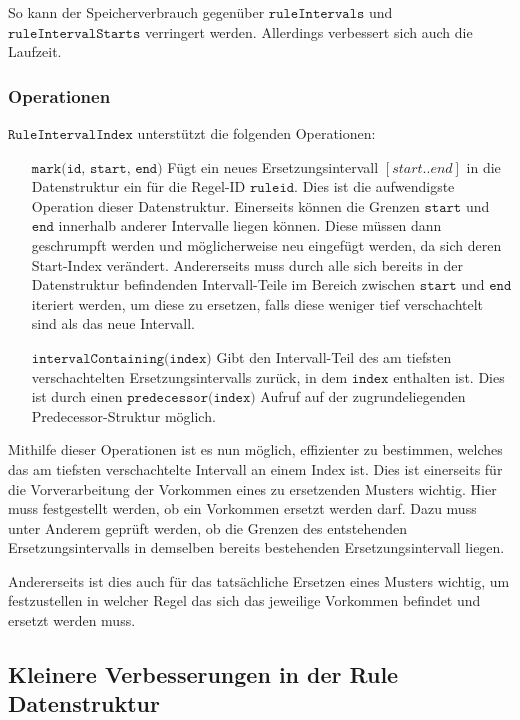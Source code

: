So kann der Speicherverbrauch gegenüber $\texttt{ruleIntervals}$ und $\texttt{ruleIntervalStarts}$ verringert werden. Allerdings verbessert sich auch die Laufzeit.

\subsubsection{Operationen}

$\texttt{RuleIntervalIndex}$ unterstützt die folgenden Operationen:

\begin{itemize}[leftmargin=5cm]
	\item[$\texttt{mark(id, start, end)}$] Fügt ein neues Ersetzungsintervall $[start.. end]$ in die Datenstruktur ein für die Regel-ID $\texttt{ruleid}$. Dies ist die aufwendigste Operation dieser Datenstruktur. Einerseits können die Grenzen $\texttt{start}$ und $\texttt{end}$ innerhalb anderer Intervalle liegen können. Diese müssen dann geschrumpft werden und möglicherweise neu eingefügt werden, da sich deren Start-Index verändert. Andererseits muss durch alle sich bereits in der Datenstruktur befindenden Intervall-Teile im Bereich zwischen $\texttt{start}$ und $\texttt{end}$ iteriert werden, um diese zu ersetzen, falls diese weniger tief verschachtelt sind als das neue Intervall.
	\item[$\texttt{intervalContaining(index)}$] Gibt den Intervall-Teil des am tiefsten verschachtelten Ersetzungsintervalls zurück, in dem $\texttt{index}$ enthalten ist. Dies ist durch einen $\texttt{predecessor(index)}$ Aufruf auf der zugrundeliegenden Predecessor-Struktur möglich.
\end{itemize}

Mithilfe dieser Operationen ist es nun möglich, effizienter zu bestimmen, welches das am tiefsten verschachtelte Intervall an einem Index ist. Dies ist einerseits für die Vorverarbeitung der Vorkommen eines zu ersetzenden Musters wichtig. Hier muss festgestellt werden, ob ein Vorkommen ersetzt werden darf. Dazu muss unter Anderem geprüft werden, ob die Grenzen des entstehenden Ersetzungsintervalls in demselben bereits bestehenden Ersetzungsintervall liegen. 

Andererseits ist dies auch für das tatsächliche Ersetzen eines Musters wichtig, um festzustellen in welcher Regel das sich das jeweilige Vorkommen befindet und ersetzt werden muss.

\subsection{Kleinere Verbesserungen in der Rule Datenstruktur}

